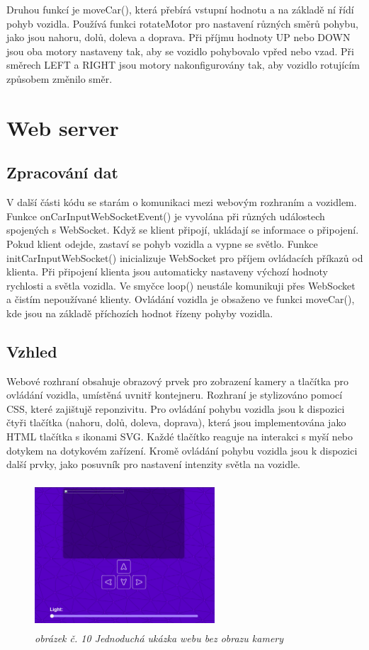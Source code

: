 \documentclass[12pt, a4paper,
oneside,      %
openany
]{report}
\begin{document}
\noindent Druhou funkcí je moveCar(), která přebírá vstupní hodnotu a na základě ní řídí pohyb vozidla. Používá funkci rotateMotor pro nastavení různých směrů pohybu, jako jsou nahoru, dolů, doleva a doprava. Při příjmu hodnoty UP nebo DOWN jsou oba motory nastaveny tak, aby se vozidlo pohybovalo vpřed nebo vzad. Při směrech LEFT a RIGHT jsou motory nakonfigurovány tak, aby vozidlo rotujícím způsobem změnilo směr.

\section{Web server}
\subsection{Zpracování dat}
\noindent V další části kódu se starám o komunikaci mezi webovým rozhraním a vozidlem. Funkce onCarInputWebSocketEvent() je vyvolána při různých událostech spojených s WebSocket. Když se klient připojí, ukládají se informace o připojení. Pokud klient odejde, zastaví se pohyb vozidla a vypne se světlo. Funkce initCarInputWebSocket() inicializuje WebSocket pro příjem ovládacích příkazů od klienta. Při připojení klienta jsou automaticky nastaveny výchozí hodnoty rychlosti a světla vozidla. Ve smyčce loop() neustále komunikuji přes WebSocket a čistím nepoužívané klienty. Ovládání vozidla je obsaženo ve funkci moveCar(), kde jsou na základě příchozích hodnot řízeny pohyby vozidla.

\subsection{Vzhled}
\noindent Webové rozhraní obsahuje obrazový prvek pro zobrazení kamery a tlačítka pro ovládání vozidla, umístěná uvnitř kontejneru. Rozhraní je stylizováno pomocí CSS, které zajištujě reponzivitu. Pro ovládání pohybu vozidla jsou k dispozici čtyři tlačítka (nahoru, dolů, doleva, doprava), která jsou implementována jako HTML tlačítka s ikonami SVG. Každé tlačítko reaguje na interakci s myší nebo dotykem na dotykovém zařízení. Kromě ovládání pohybu vozidla jsou k dispozici další prvky, jako posuvník pro nastavení intenzity světla na vozidle.
\begin{figure}[H]
    \centering
	\includegraphics[width=0.6\textwidth, height=5.5cm]{image/webscreen.png}
    \caption*{\textit{obrázek č. 10 Jednoduchá ukázka webu bez obrazu kamery}}
    \label{fig:webDesign}
\end{figure}
\end{document}
